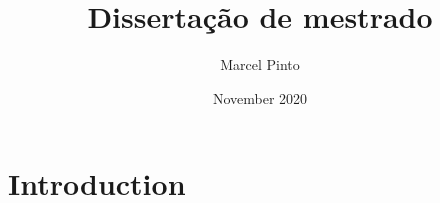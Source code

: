 \documentclass{article}
\title{Dissertação de mestrado}
\author{Marcel Pinto}
\date{November 2020}
\begin{document}
\maketitle

\section{Introduction}
\end{document}
